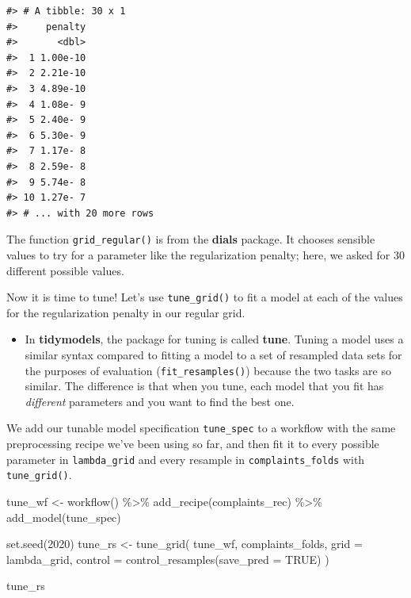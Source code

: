 \documentclass[
]{krantz}
\makeatletter
\newenvironment{Shaded}{\begin{snugshade}}{\end{snugshade}}
\newcommand{\AttributeTok}[1]{\textcolor[rgb]{0.77,0.63,0.00}{#1}}
\newcommand{\ConstantTok}[1]{\textcolor[rgb]{0.00,0.00,0.00}{#1}}
\newcommand{\DecValTok}[1]{\textcolor[rgb]{0.00,0.00,0.81}{#1}}
\newcommand{\FunctionTok}[1]{\textcolor[rgb]{0.00,0.00,0.00}{#1}}
\newcommand{\NormalTok}[1]{#1}
\newcommand{\OtherTok}[1]{\textcolor[rgb]{0.56,0.35,0.01}{#1}}
\newcommand{\SpecialCharTok}[1]{\textcolor[rgb]{0.00,0.00,0.00}{#1}}
\newenvironment{kframe}{%
\medskip{}
\setlength{\fboxsep}{.8em}
 \def\at@end@of@kframe{}%
 \ifinner\ifhmode%
  \def\at@end@of@kframe{\end{minipage}}%
  \begin{minipage}{\columnwidth}%
 \fi\fi%
 \def\FrameCommand##1{\hskip\@totalleftmargin \hskip-\fboxsep
 \colorbox{shadecolor}{##1}\hskip-\fboxsep
     \hskip-\linewidth \hskip-\@totalleftmargin \hskip\columnwidth}%
 \MakeFramed {\advance\hsize-\width
   \@totalleftmargin\z@ \linewidth\hsize
   \@setminipage}}%
 {\par\unskip\endMakeFramed%
 \at@end@of@kframe}
\renewenvironment{Shaded}{\begin{kframe}}{\end{kframe}}
\newenvironment{rmdblock}[1]
  {\begin{shaded*}
  \begin{itemize}[left = -1cm, labelsep = 1cm]
  \renewcommand{\labelitemi}{
    \raisebox{-.7\height}[0pt][0pt]{
      {\setkeys{Gin}{width=3em,keepaspectratio}\texttt{[image: images/\#1]}}
    }
  }
 
  \item
  }
  {
  \end{itemize}
  \end{shaded*}
  }
\newenvironment{rmdpackage}
  {\begin{rmdblock}{package}}
  {\end{rmdblock}}
\makeatother
\begin{document}
\begin{verbatim}
#> # A tibble: 30 x 1
#>     penalty
#>       <dbl>
#>  1 1.00e-10
#>  2 2.21e-10
#>  3 4.89e-10
#>  4 1.08e- 9
#>  5 2.40e- 9
#>  6 5.30e- 9
#>  7 1.17e- 8
#>  8 2.59e- 8
#>  9 5.74e- 8
#> 10 1.27e- 7
#> # ... with 20 more rows
\end{verbatim}

The function \texttt{grid\_regular()} is from the \textbf{dials} package. It chooses sensible values to try for a parameter like the regularization penalty; here, we asked for 30 different possible values.

Now it is time to tune! Let's use \texttt{tune\_grid()} to fit a model at each of the values for the regularization penalty in our regular grid.

\begin{rmdpackage}
In \textbf{tidymodels}, the package for tuning is called \textbf{tune}.
Tuning a model uses a similar syntax compared to fitting a model to a
set of resampled data sets for the purposes of evaluation
(\texttt{fit\_resamples()}) because the two tasks are so similar. The
difference is that when you tune, each model that you fit has
\emph{different} parameters and you want to find the best one.
\end{rmdpackage}

We add our tunable model specification \texttt{tune\_spec} to a workflow with the same preprocessing recipe we've been using so far, and then fit it to every possible parameter in \texttt{lambda\_grid} and every resample in \texttt{complaints\_folds} with \texttt{tune\_grid()}.

\begin{Shaded}
\begin{Highlighting}[]
\NormalTok{tune\_wf }\OtherTok{\textless{}{-}} \FunctionTok{workflow}\NormalTok{() }\SpecialCharTok{\%\textgreater{}\%}
  \FunctionTok{add\_recipe}\NormalTok{(complaints\_rec) }\SpecialCharTok{\%\textgreater{}\%}
  \FunctionTok{add\_model}\NormalTok{(tune\_spec)}

\FunctionTok{set.seed}\NormalTok{(}\DecValTok{2020}\NormalTok{)}
\NormalTok{tune\_rs }\OtherTok{\textless{}{-}} \FunctionTok{tune\_grid}\NormalTok{(}
\NormalTok{  tune\_wf,}
\NormalTok{  complaints\_folds,}
  \AttributeTok{grid =}\NormalTok{ lambda\_grid,}
  \AttributeTok{control =} \FunctionTok{control\_resamples}\NormalTok{(}\AttributeTok{save\_pred =} \ConstantTok{TRUE}\NormalTok{)}
\NormalTok{)}

\NormalTok{tune\_rs}
\end{Highlighting}
\end{Shaded}
\end{document}
